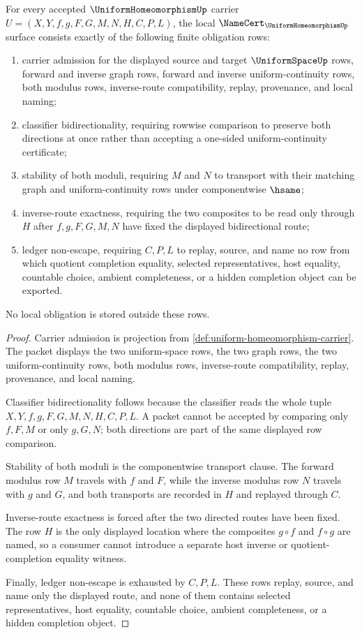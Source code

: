 \begin{theorem}
\label{thm:uniform-homeomorphism-namecert-obligations}
For every accepted $\UniformHomeomorphismUp$ carrier $U=(X,Y,f,g,F,G,M,N,H,C,P,L)$, the local $\NameCert_{\UniformHomeomorphismUp}$ surface consists exactly of the following finite obligation rows:
\begin{enumerate}
\item carrier admission for the displayed source and target $\UniformSpaceUp$ rows, forward and inverse graph rows, forward and inverse uniform-continuity rows, both modulus rows, inverse-route compatibility, replay, provenance, and local naming;
\item classifier bidirectionality, requiring rowwise comparison to preserve both directions at once rather than accepting a one-sided uniform-continuity certificate;
\item stability of both moduli, requiring $M$ and $N$ to transport with their matching graph and uniform-continuity rows under componentwise $\hsame$;
\item inverse-route exactness, requiring the two composites to be read only through $H$ after $f,g,F,G,M,N$ have fixed the displayed bidirectional route;
\item ledger non-escape, requiring $C,P,L$ to replay, source, and name no row from which quotient completion equality, selected representatives, host equality, countable choice, ambient completeness, or a hidden completion object can be exported.
\end{enumerate}
No local obligation is stored outside these rows.
\end{theorem}
\begin{proof}
Carrier admission is projection from \autoref{def:uniform-homeomorphism-carrier}. The packet displays the two uniform-space rows, the two graph rows, the two uniform-continuity rows, both modulus rows, inverse-route compatibility, replay, provenance, and local naming.

Classifier bidirectionality follows because the classifier reads the whole tuple $X,Y,f,g,F,G,M,N,H,C,P,L$. A packet cannot be accepted by comparing only $f,F,M$ or only $g,G,N$; both directions are part of the same displayed row comparison.

Stability of both moduli is the componentwise transport clause. The forward modulus row $M$ travels with $f$ and $F$, while the inverse modulus row $N$ travels with $g$ and $G$, and both transports are recorded in $H$ and replayed through $C$.

Inverse-route exactness is forced after the two directed routes have been fixed. The row $H$ is the only displayed location where the composites $g\circ f$ and $f\circ g$ are named, so a consumer cannot introduce a separate host inverse or quotient-completion equality witness.

Finally, ledger non-escape is exhausted by $C,P,L$. These rows replay, source, and name only the displayed route, and none of them contains selected representatives, host equality, countable choice, ambient completeness, or a hidden completion object.
\end{proof}
